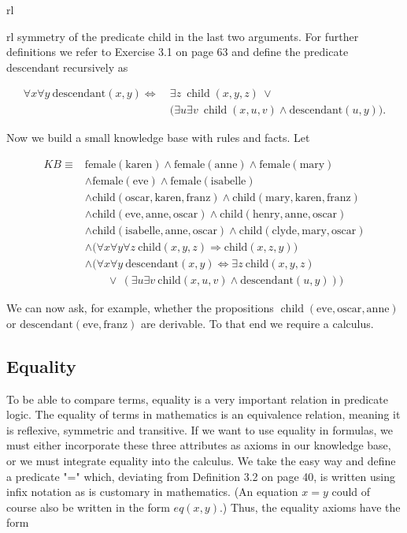 \documentclass[10pt]{book}
\begin{document}
\begin{center}
\begin{tabular}{rl}
\begin{tabular}{rl}
symmetry of the predicate child in the last two arguments. For further definitions we refer to Exercise 3.1 on page 63 and define the predicate descendant recursively as

\[
\begin{aligned}
\forall x \forall y \ \text{descendant}(x, y) \Leftrightarrow & \ \exists z \ \operatorname{child}(x, y, z) \ \vee \\
& \ \bigl(\exists u \exists v \ \operatorname{child}(x, u, v) \wedge \text{descendant}(u, y)\bigr) .
\end{aligned}
\]

Now we build a small knowledge base with rules and facts. Let

\[
\begin{aligned}
KB \equiv {} & \text{female}(\text{karen}) \wedge \text{female}(\text{anne}) \wedge \text{female}(\text{mary}) \\
& \wedge \text{female}(\text{eve}) \wedge \text{female}(\text{isabelle}) \\
& \wedge \text{child}(\text{oscar}, \text{karen}, \text{franz}) \wedge \text{child}(\text{mary}, \text{karen}, \text{franz}) \\
& \wedge \text{child}(\text{eve}, \text{anne}, \text{oscar}) \wedge \text{child}(\text{henry}, \text{anne}, \text{oscar}) \\
& \wedge \text{child}(\text{isabelle}, \text{anne}, \text{oscar}) \wedge \text{child}(\text{clyde}, \text{mary}, \text{oscar}) \\
& \wedge \bigl(\forall x \forall y \forall z \ \text{child}(x, y, z) \Rightarrow \text{child}(x, z, y)\bigr) \\
& \wedge \bigl(\forall x \forall y \ \text{descendant}(x, y) \Leftrightarrow \exists z \ \text{child}(x, y, z) \\
& \qquad \vee \ (\exists u \exists v \ \text{child}(x, u, v) \wedge \text{descendant}(u, y))\bigr)
\end{aligned}
\]

We can now ask, for example, whether the propositions $\operatorname{child}(\text{eve}, \text{oscar}, \text{anne})$ or $\text{descendant}(\text{eve}, \text{franz})$ are derivable. To that end we require a calculus.

\subsection{Equality}
To be able to compare terms, equality is a very important relation in predicate logic. The equality of terms in mathematics is an equivalence relation, meaning it is reflexive, symmetric and transitive. If we want to use equality in formulas, we must either incorporate these three attributes as axioms in our knowledge base, or we must integrate equality into the calculus. We take the easy way and define a predicate "=" which, deviating from Definition 3.2 on page 40, is written using infix notation as is customary in mathematics. (An equation $x=y$ could of course also be written in the form $eq(x, y)$.) Thus, the equality axioms have the form


\end{tabular}
\end{tabular}
\end{center}
\end{document}

